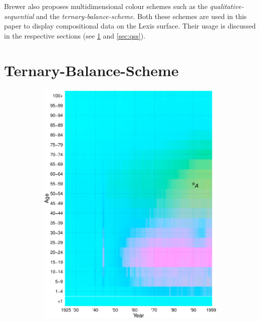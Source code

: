 \documentclass{scrartcl}
\begin{document}
Brewer also proposes multidimensional colour schemes such as the \emph{qualitative-sequential} and the \emph{ternary-balance-scheme}. Both these schemes are used in this paper to display compositional data on the Lexis surface. Their usage is discussed in the respective sections (see \ref{sec:tbs} and \ref{sec:qss}).

\clearpage

\section{Ternary-Balance-Scheme} %
\label{sec:tbs}

\begin{figure}[!htb]
  \begin{subfigure}[t]{0.65\textwidth}
    \includegraphics[width = \textwidth]{../fig/tern_balance_no_lgnd.pdf}

\end{subfigure}
\end{figure}
\end{document}
